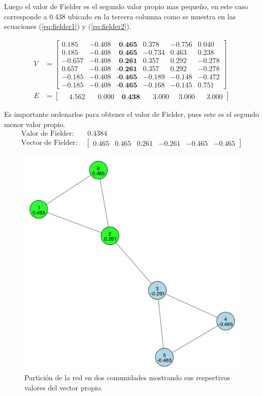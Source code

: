 \documentclass[letterpaper]{article}
\begin{document}
Luego el valor de Fielder es el segundo valor propio mas pequeño, en este caso corresponde a 0.438 ubicado en la tercera columna como se muestra en las ecuaciones (\ref{eq:fielder1}) y (\ref{eq:fielder2}).


\begin{align}
  V &= \begin{bmatrix}
     0.185 & -0.408 & \textbf{ 0.465} &  0.378 & -0.756 &  0.040 \\
     0.185 & -0.408 & \textbf{ 0.465} & -0.734 &  0.463 &  0.238 \\
    -0.657 & -0.408 & \textbf{ 0.261} &  0.357 &  0.292 & -0.278 \\
     0.657 & -0.408 & \textbf{-0.261} &  0.357 &  0.292 & -0.278 \\
    -0.185 & -0.408 & \textbf{-0.465} & -0.189 & -0.148 & -0.472 \\
    -0.185 & -0.408 & \textbf{-0.465} & -0.168 & -0.145 &  0.751
  \end{bmatrix} \label{eq:fielder1}\\
  E &= \begin{bmatrix} \quad 4.562 & \quad 0.000 & \; \textbf{0.438} & \quad 3.000 & \; \; 3.000 & \;\;\; 3.000 \end{bmatrix} \label{eq:fielder2}
\end{align}

Es importante ordenarlos para obtener el valor de Fielder, pues este es el segundo menor valor propio.
\begin{align}
  \text{Valor de Fielder: }  & \; 0.4384\\
  \text{Vector de Fielder: } & \begin{bmatrix}0.465 & 0.465 & 0.261 & -0.261 & -0.465 & -0.465\end{bmatrix}
\end{align}


\begin{figure}[H]
  \centering
  \includegraphics[width=.7\linewidth]{img/p2.png}
  \caption{Partición de la red en dos comunidades mostrando sus respectivos valores del vector propio.}
  \label{red:2}
\end{figure}
\end{document}
